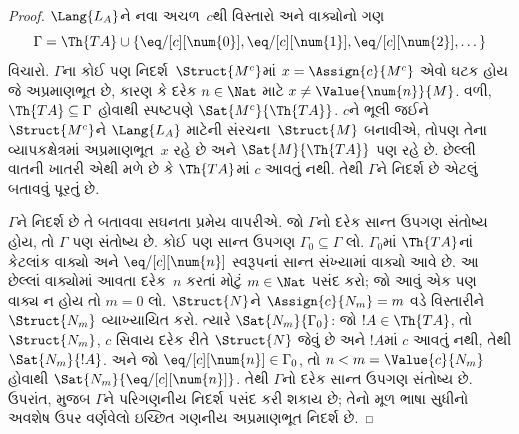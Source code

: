 \begin{proof}
$\Lang{L_A}$ને નવા અચળ~$c$થી વિસ્તારો અને વાક્યોનો ગણ
\[
\Gamma=\Th{TA}\cup\{\eq/[c][\num{0}],\eq/[c][\num{1}],
\eq/[c][\num{2}],\dots\}
\]
વિચારો. $\Gamma$ના કોઈ પણ નિદર્શ~$\Struct{M^c}$માં
$x=\Assign{c}{M^c}$ એવો ઘટક હોય જે અપ્રમાણભૂત છે, કારણ કે
દરેક $n\in\Nat$ માટે $x\neq\Value{\num{n}}{M}$. વળી,
$\Th{TA}\subseteq\Gamma$ હોવાથી સ્પષ્ટપણે
$\Sat{M^c}{\Th{TA}}$. $c$ને ભૂલી જઈને $\Struct{M^c}$ને
$\Lang{L_A}$ માટેની સંરચના~$\Struct{M}$ બનાવીએ, તોપણ તેના
વ્યાપકક્ષેત્રમાં અપ્રમાણભૂત~$x$ રહે છે અને
$\Sat{M}{\Th{TA}}$ પણ રહે છે. છેલ્લી વાતની ખાતરી એથી મળે છે કે
$\Th{TA}$માં $c$ આવતું નથી. તેથી $\Gamma$ને નિદર્શ છે એટલું બતાવવું
પૂરતું છે.

$\Gamma$ને નિદર્શ છે તે બતાવવા સઘનતા પ્રમેય વાપરીએ. જો $\Gamma$નો
દરેક સાન્ત ઉપગણ સંતોષ્ય હોય, તો $\Gamma$ પણ સંતોષ્ય છે. કોઈ પણ સાન્ત
ઉપગણ $\Gamma_0\subseteq\Gamma$ લો. $\Gamma_0$માં $\Th{TA}$નાં કેટલાંક
વાક્યો અને $\eq/[c][\num{n}]$ સ્વરૂપનાં સાન્ત સંખ્યામાં વાક્યો
આવે છે. આ છેલ્લાં વાક્યોમાં આવતા દરેક~$n$ કરતાં મોટું $m\in\Nat$
પસંદ કરો; જો આવું એક પણ વાક્ય ન હોય તો $m=0$ લો. $\Struct{N}$ને
$\Assign{c}{N_m}=m$ વડે વિસ્તારીને $\Struct{N_m}$ વ્યાખ્યાયિત કરો.
ત્યારે $\Sat{N_m}{\Gamma_0}$: જો $!A\in\Th{TA}$, તો $\Struct{N_m}$,
$c$ સિવાય દરેક રીતે $\Struct{N}$ જેવું છે અને $!A$માં $c$ આવતું નથી,
તેથી $\Sat{N_m}{!A}$. અને જો
$\eq/[c][\num{n}]\in\Gamma_0$, તો $n<m=\Value{c}{N_m}$ હોવાથી
$\Sat{N_m}{\eq/[c][\num{n}]}$. તેથી $\Gamma$નો દરેક સાન્ત ઉપગણ
સંતોષ્ય છે. ઉપરાંત,  મુજબ $\Gamma$ને
પરિગણનીય નિદર્શ પસંદ કરી શકાય છે; તેનો મૂળ ભાષા સુધીનો અવશેષ
ઉપર વર્ણવેલો ઇચ્છિત ગણનીય અપ્રમાણભૂત નિદર્શ છે.
\end{proof}
\endgroup


\begingroup
\makeatletter{}\makeatother

